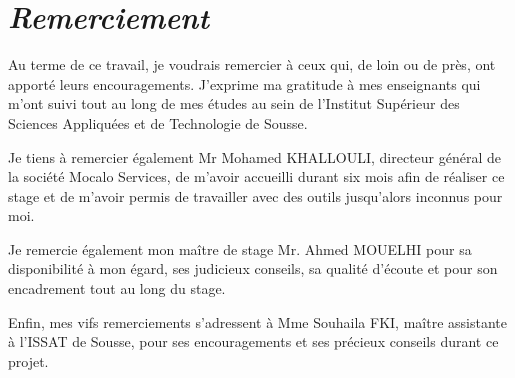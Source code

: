 \chapter*{\textit{Remerciement}}


\vspace{0.3cm}

\fontsize{12pt}{24pt}\selectfont 
\hspace{4mm}Au terme de ce travail, je voudrais remercier à ceux qui, de loin ou de près, ont apporté leurs encouragements. J'exprime ma gratitude à mes enseignants qui m'ont suivi tout au long de mes études au sein de l’Institut Supérieur des Sciences Appliquées et de Technologie de Sousse.
\par Je tiens à remercier également Mr Mohamed KHALLOULI, directeur général de la société Mocalo Services, de m’avoir accueilli durant six mois afin de réaliser ce stage et de m’avoir permis de travailler avec des outils jusqu’alors inconnus pour moi.
\par Je remercie également mon maître de stage Mr. Ahmed MOUELHI pour sa disponibilité à mon égard, ses judicieux conseils, sa qualité d’écoute et pour son encadrement tout au long du stage.
\par Enfin, mes vifs remerciements s’adressent à Mme Souhaila FKI, maître assistante à l’ISSAT de Sousse, pour ses encouragements et ses précieux conseils durant ce projet. 